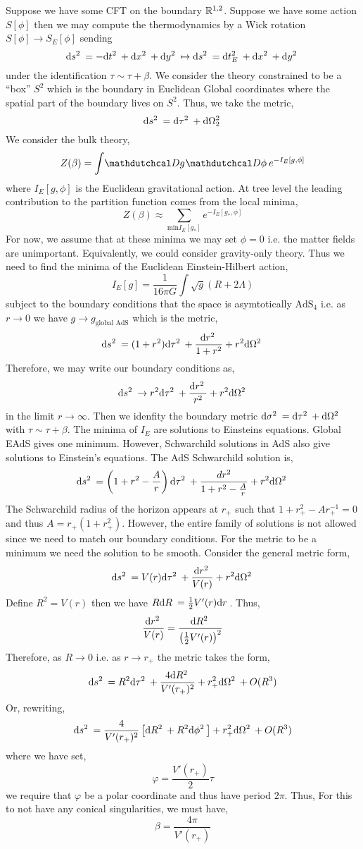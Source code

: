 \documentclass[12pt]{extarticle}
\newcommand{\AdS}[1]{\mathrm{AdS}_{#1}}
\begin{document}
Suppose we have some CFT on the boundary $\mathbb{R}^{1,2}$. Suppose we have some action $S[\phi]$ then we may compute the thermodynamics by a Wick rotation $S[\phi] \to S_{E}[\phi]$ sending 
\[ \mathrm{d}s^2 \: = - \mathrm{d}t^2 \: + \mathrm{d}x^2 \: + \mathrm{d}y^2 \: \mapsto \mathrm{d}s^2 \: = \mathrm{d}t_E^2 \: + \mathrm{d}x^2 \: + \mathrm{d}y^2 \: \]
under the identification $\tau \sim \tau + \beta$. We consider the theory constrained to be a ``box'' $S^2$ which is the boundary in Euclidean Global coordinates where the spatial part of the boundary lives on $S^2$. Thus, we take the metric,
\[ \mathrm{d}s^2 \: = \mathrm{d}\tau^2 \: + \mathrm{d}\Omega_2^2 \: \]
We consider the bulk theory,
\[ Z(\beta) = \int \pathd{g} \pathd{\phi} e^{-I_E[g, \phi]} \] 
where $I_E[g, \phi]$ is the Euclidean gravitational action. At tree level the leading contribution to the partition function comes from the local minima,
\[ Z(\beta) \approx \sum_{\text{min} I_E[g_*] } e^{- I_E[g_*, \phi] } \]
For now, we assume that at these minima we may set $\phi = 0$ i.e. the matter fields are unimportant. Equivalently, we could consider gravity-only theory. Thus we need to find the minima of the Euclidean Einstein-Hilbert action,
\[ I_E[g] = \frac{1}{16 \pi G} \int \sqrt{g} (R + 2 \Lambda) \]
subject to the boundary conditions that the space is asymtotically $\AdS{4}$ i.e. as $r \to 0$ we have $g \to g_{\text{global AdS}}$ which is the metric,
\[ \mathrm{d}s^2 \: = (1 + r^2) \mathrm{d}\tau^2 \: + \frac{\mathrm{d}r^2 \:}{1 + r^2} + r^2 \mathrm{d}\Omega^2 \: \]
Therefore, we may write our boundary conditions as,
\[ \mathrm{d}s^2 \: \to r^2 \mathrm{d}\tau^2 \: + \frac{\mathrm{d}r^2 \:}{r^2} + r^2 \mathrm{d}\Omega^2 \: \]
in the limit $r \to \infty$. Then we idenfity the boundary metric $\mathrm{d}\sigma^2 \: = \mathrm{d}\tau^2 \: + \mathrm{d}\Omega^2 \:$ with $\tau \sim \tau + \beta$. The minima of $I_E$ are solutions to Einsteins equations. Global EAdS gives one minimum. However, Schwarchild solutions in AdS also give solutions to Einstein's equations. The AdS Schwarchild solution is,
\begin{align*}
\mathrm{d}s^2 \: = \left( 1 + r^2 - \frac{A}{r} \right) \mathrm{d}\tau^2 \: + \frac{d{r^2}}{1 + r^2 - \frac{A}{r}} + r^2 \mathrm{d}\Omega^2 \: 
\end{align*} 
The Schwarchild radius of the horizon appears at $r_+$ such that $1 + r_+^2 - A r_+^{-1} = 0$ and thus $A = r_+(1 + r_+^2)$. However, the entire family of solutions is not allowed since we need to match our boundary conditions. For the metric to be a minimum we need the solution to be smooth. Consider the general metric form,
\[ \mathrm{d}s^2 \: = V(r) \mathrm{d}\tau^2 \: + \frac{\mathrm{d}r^2 \:}{V(r)} + r^2 \mathrm{d}\Omega^2 \: \]
Define $R^2 = V(r)$ then we have $R \mathrm{d}R \: = \tfrac{1}{2} V'(r) \mathrm{d}r \:$. Thus,
\[ \frac{\mathrm{d}r^2 \:}{V(r)} = \frac{\mathrm{d}R^2 \:}{\left( \tfrac{1}{2} V'(r) \right)^2} \]
Therefore, as $R \to 0$ i.e. as $r \to r_+$ the metric takes the form,
\[ \mathrm{d}s^2 \: = R^2 \mathrm{d}\tau^2 \: + \frac{4 \mathrm{d}R^2 \:}{V'(r_+)^2} + r_+^2 \mathrm{d}\Omega^2 \: + O(R^3) \]
Or, rewriting,
\[ \mathrm{d}s^2 \: = \frac{4}{V'(r_+)^2} \left[ \mathrm{d}R^2 \: + R^2 \mathrm{d}\phi^2 \: \right] + r_+^2 \mathrm{d}\Omega^2 \: + O(R^3) \]
where we have set,
\[ \varphi = \frac{V'(r_+)}{2} \tau \]
we require that $\varphi$ be a polar coordinate and thus have period $2 \pi$.
Thus, For this to not have any conical singularities, we must have, 
\[ \beta = \frac{4 \pi}{V'(r_+)} \]
\end{document}
